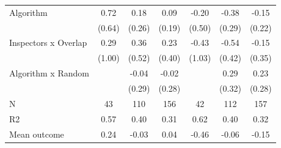 \begin{tabular}{lccc|ccc}
Algorithm   &        0.72         &        0.18         &        0.09         &       -0.20         &       -0.38         &       -0.15         \\
            &      (0.64)         &      (0.26)         &      (0.19)         &      (0.50)         &      (0.29)         &      (0.22)         \\
\addlinespace
Inspectors x Overlap&        0.29         &        0.36         &        0.23         &       -0.43         &       -0.54         &       -0.15         \\
            &      (1.00)         &      (0.52)         &      (0.40)         &      (1.03)         &      (0.42)         &      (0.35)         \\
\addlinespace
Algorithm x Random&                     &       -0.04         &       -0.02         &                     &        0.29         &        0.23         \\
            &                     &      (0.29)         &      (0.28)         &                     &      (0.32)         &      (0.28)         \\
\midrule
N           &          43         &         110         &         156         &          42         &         112         &         157         \\
R2          &        0.57         &        0.40         &        0.31         &        0.62         &        0.40         &        0.32         \\
Mean outcome&        0.24         &       -0.03         &        0.04         &       -0.46         &       -0.06         &       -0.15         \\
\bottomrule \end{tabular}
